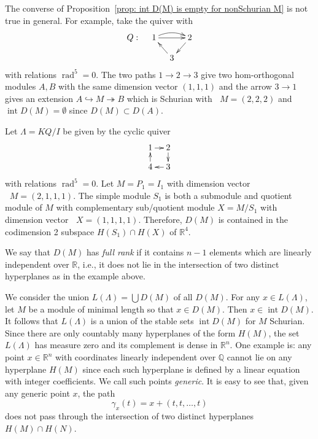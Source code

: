 \documentclass[ALCO,ThmDefs,Unicode,epreuves]{cedram}
\newcommand{\into}{\hookrightarrow}
\newcommand{\onto}{\twoheadrightarrow}
\DeclareMathOperator{\undim}{\underline{dim}}
\DeclareMathOperator{\intr}{int}
\DeclareMathOperator{\rad}{rad}
\newcommand{\field}[1]{\mathbb{#1}}
\newcommand{\RR}{\ensuremath{{\field{R}}}}
\newcommand{\QQ}{\ensuremath{{\field{Q}}}}
\begin{document}
\begin{rema}\label{added remark}
The converse of Proposition~\ref{prop: int D(M) is empty for nonSchurian M} is not true in general. For example, take the quiver with
\[
\xymatrixrowsep{10pt}\xymatrixcolsep{10pt}
\xymatrix{%
Q: &1\ar[rr]\ar@/^.5pc/[rr] &&2\ar[dl]\\
&& 3\ar[lu]
	}%
\]
with relations $\rad^5=0$. The two paths $1\to 2\to 3$ give two hom-orthogonal modules $A,B$ with the same dimension vector $(1,1,1)$ and the arrow $3\to 1$ gives an extension $A\into M\onto B$ which is Schurian with $\undim M=(2,2,2)$ and $\intr D(M)=\emptyset$ since $D(M)\subset D(A)$.
\end{rema}

\begin{exam}
Let $\Lambda=KQ/I$ be given by the cyclic quiver 
\[
\xymatrixrowsep{10pt}\xymatrixcolsep{10pt}
\xymatrix{%
1\ar[r] &2\ar[d]\\
4\ar[u] & 3\ar[l]
	}%
\]
with relations $\rad ^5=0$. Let $M=P_1=I_1$ with dimension vector $\undim M=(2,1,1,1)$. The simple module $S_1$ is both a submodule and quotient module of $M$ with complementary sub/quotient module $X=M/S_1$ with dimension vector $\undim X=(1,1,1,1)$. Therefore, $D(M)$ is contained in the codimension 2 subspace $H(S_1)\cap H(X)$ of $\RR^4$.
\end{exam}

We say that $D(M)$ has \emph{full rank} if it contains $n-1$ elements which are linearly independent over $\RR$, i.e., it does not lie in the intersection of two distinct hyperplanes as in the example above. 




We consider the union $L(\Lambda)=\bigcup D(M)$ of all $D(M)$. For any $x\in L(\Lambda)$, let $M$ be a module of minimal length so that $x\in D(M)$. Then $x\in \intr D(M)$. It follows that $L(\Lambda)$ is a union of the stable sets $\intr D(M)$ for $M$ Schurian. Since there are only countably many hyperplanes of the form $H(M)$, the set $L(\Lambda)$ has measure zero and its complement is dense in $\RR^n$. One example is: any point $x\in \RR^n$ with coordinates linearly independent over $\QQ$ cannot lie on any hyperplane $H(M)$ since each such hyperplane is defined by a linear equation with integer coefficients. We call such points \emph{generic}. It is easy to see that, given any generic point $x$, the path 
\[
\gamma_x(t)=x+(t,t,\ldots,t)
\]
does not pass through the intersection of two distinct hyperplanes $H(M)\cap H(N)$. 
\end{document}
